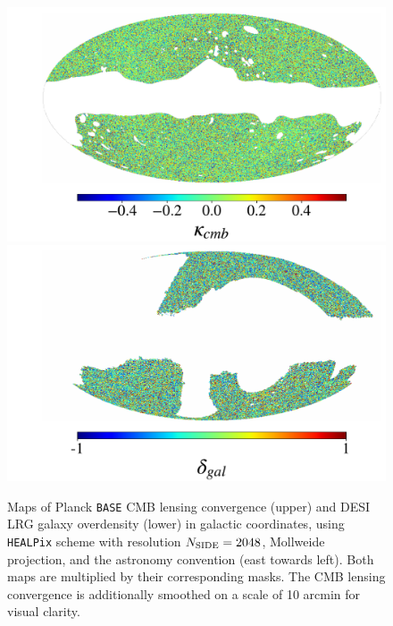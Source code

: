\begin{figure}
\includegraphics[width=\linewidth]{figures/cmb_map.pdf} 
\includegraphics[width=\linewidth]{figures/gal_map.pdf}
\caption{Maps of Planck \texttt{BASE} CMB lensing convergence (upper) and DESI LRG galaxy overdensity (lower) in galactic coordinates, using \texttt{HEALPix} scheme with resolution $N_{\rm SIDE} = 2048$, Mollweide projection, and the astronomy convention (east towards left). Both maps are multiplied by their corresponding masks. The CMB lensing convergence is additionally smoothed on a scale of 10 arcmin for visual clarity.}
\label{fig:pixel_maps}
\end{figure}



